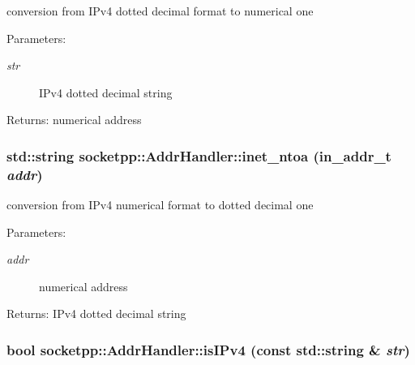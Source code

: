 conversion from IPv4 dotted decimal format to numerical one 

\begin{Desc}
\item[Parameters:]
\begin{description}
\item[{\em str}]IPv4 dotted decimal string \end{description}
\end{Desc}
\begin{Desc}
\item[Returns:]numerical address \end{Desc}
\hypertarget{classsocketpp_1_1AddrHandler_a4377d84c8ea976aeada2b2eb0ac248d}{
\subsubsection[{inet\_\-ntoa}]{\setlength{\rightskip}{0pt plus 5cm}std::string socketpp::AddrHandler::inet\_\-ntoa (in\_\-addr\_\-t {\em addr})}}
\label{classsocketpp_1_1AddrHandler_a4377d84c8ea976aeada2b2eb0ac248d}


conversion from IPv4 numerical format to dotted decimal one 

\begin{Desc}
\item[Parameters:]
\begin{description}
\item[{\em addr}]numerical address \end{description}
\end{Desc}
\begin{Desc}
\item[Returns:]IPv4 dotted decimal string \end{Desc}
\hypertarget{classsocketpp_1_1AddrHandler_652e24c273f7905cebf8d04b3cfef74d}{
\subsubsection[{isIPv4}]{\setlength{\rightskip}{0pt plus 5cm}bool socketpp::AddrHandler::isIPv4 (const std::string \& {\em str})}}
\label{classsocketpp_1_1AddrHandler_652e24c273f7905cebf8d04b3cfef74d}


